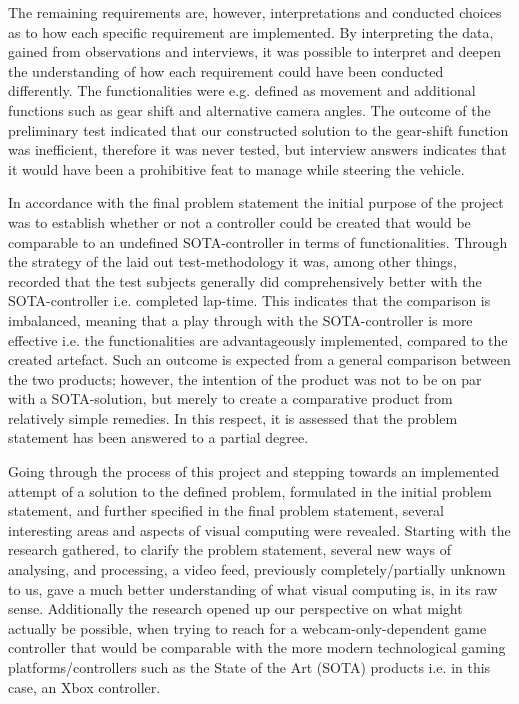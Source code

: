 The remaining requirements are, however, interpretations and conducted choices as to how each specific requirement are implemented. By interpreting the data, gained from observations and interviews, it was possible to interpret and deepen the understanding of how each requirement could have been conducted differently. The functionalities were e.g. defined as movement and additional functions such as gear shift and alternative camera angles. The outcome of the preliminary test indicated that our constructed solution to the gear-shift function was inefficient, therefore it was never tested, but interview answers indicates that it would have been a prohibitive feat to manage while steering the vehicle.
\bigskip

In accordance with the final problem statement the initial purpose of the project was to establish whether or not a controller could be created that would be comparable to an undefined SOTA-controller in terms of functionalities.
Through the strategy of the laid out test-methodology it was, among other things, recorded that the test subjects generally did comprehensively better with the SOTA-controller i.e. completed lap-time. This indicates that the comparison is imbalanced, meaning that a play through with the SOTA-controller is more effective i.e. the functionalities are advantageously implemented, compared to the created artefact. Such an outcome is expected from a general comparison between the two products; however, the intention of the product was not to be on par with a SOTA-solution, but merely to create a comparative product from relatively simple remedies. In this respect, it is assessed that the problem statement has been answered to a partial degree.	
\bigskip

Going through the process of this project and stepping towards an implemented attempt of a solution to the defined problem, formulated in the initial problem statement, and further specified in the final problem statement, several interesting areas and aspects of visual computing were revealed. Starting with the research gathered, to clarify the problem statement, several new ways of analysing, and processing, a video feed, previously completely/partially unknown to us, gave a much better understanding of what visual computing is, in its raw sense. Additionally the research opened up our perspective on what might actually be possible, when trying to reach for a webcam-only-dependent game controller that would be comparable with the more modern technological gaming platforms/controllers such as the State of the Art (SOTA) products i.e. in this case, an Xbox controller.
\bigskip

